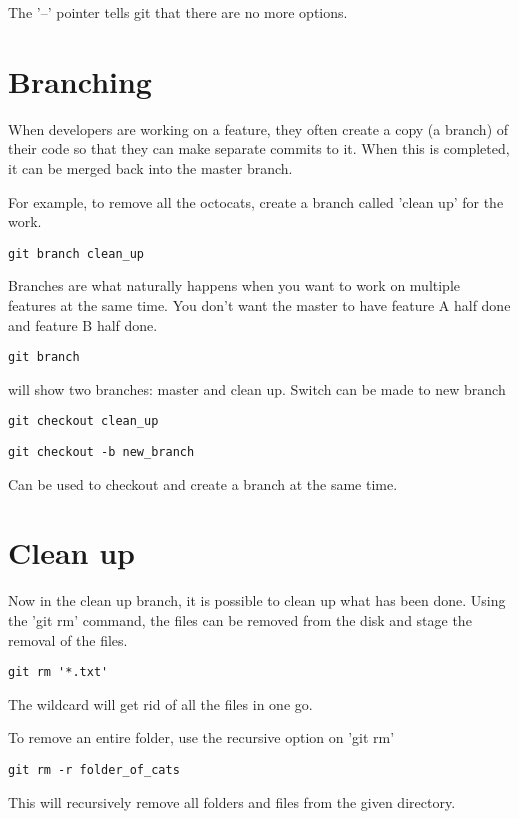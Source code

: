 \documentclass[11pt]{article} %
\begin{document}
The '--' pointer tells git that there are no more options.  

\section{Branching}
When developers are working on a feature, they often create a copy (a branch) of their code so that they can make separate commits to it.  When this is completed, it can be merged back into the master branch. 

For example, to remove all the octocats, create a branch called 'clean up' for the work. 

\begin{lstlisting}
git branch clean_up  
\end{lstlisting}

Branches are what naturally happens when you want to work on multiple features at the same time.  You don't want the master to have feature A half done and feature B half done. 

\begin{lstlisting}
git branch  
\end{lstlisting}
will show two branches:  master and clean up.  Switch can be made to new branch
\begin{lstlisting}
git checkout clean_up  
\end{lstlisting}

\begin{lstlisting}
git checkout -b new_branch 
\end{lstlisting}
Can be used to checkout and create a branch at the same time.  

\section{Clean up}
Now in the clean up branch, it is possible to clean up what has been done. Using the 'git rm' command, the files can be removed from the disk and stage the removal of the files. 

\begin{lstlisting}
git rm '*.txt' 
\end{lstlisting}
The wildcard will get rid of all the files in one go. 

To remove an entire folder, use the recursive option on 'git rm'
\begin{lstlisting}
git rm -r folder_of_cats
\end{lstlisting}

This will recursively remove all folders and files from the given directory.
\end{document}
